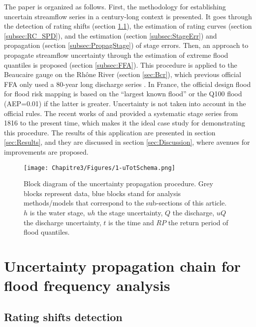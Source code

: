     The paper is organized as follows. First, the methodology for establishing uncertain streamflow series in a century-long context is presented. It goes through the detection of rating shifts (section \ref{subsec:RatingShifts}), the estimation of rating curves (section \ref{subsec:RC_SPD}), and the estimation (section \ref{subsec:StageErr}) and propagation (section \ref{subsec:PropagStage}) of stage errors. Then, an approach to propagate streamflow uncertainty through the estimation of extreme flood quantiles is proposed (section \ref{subsec:FFA}). This procedure is applied to the Beaucaire gauge on the Rhône River (section \ref{sec:Bcr}), which previous official FFA only used a 80-year long discharge series \citep{rigaudiere_etude_2000}. In France, the official design flood for flood risk mapping is based on the “largest known flood” or the Q100 flood (AEP=0.01) if the latter is greater. Uncertainty is not taken into account in the official rules. The recent works of \citet{pichard_hydro-climatology_2017} and \citet{bard_actualisation_2018} provided a systematic stage series from 1816 to the present time, which makes it the ideal case study for demonstrating this procedure. The results of this application are presented in section \ref{sec:Results}, and they are discussed in section \ref{sec:Discussion}, where avenues for improvements are proposed.
    
    \begin{figure}[h!]
    \centering
        \texttt{[image: Chapitre3/Figures/1-uTotSchema.png]}
        \caption{Block diagram of the uncertainty propagation procedure. Grey blocks represent data, blue blocks stand for analysis methods/models that correspond to the sub-sections of this article. $h$ is the water stage, $uh$ the stage uncertainty, $Q$ the discharge, $uQ$ the discharge uncertainty, $t$ is the time and $RP$ the return period of flood quantiles.}
        \label{fig:ChProp}
    \end{figure}
    \FloatBarrier
    
\section{Uncertainty propagation chain for flood frequency analysis}
     \subsection{Rating shifts detection}
     \label{subsec:RatingShifts}
    
